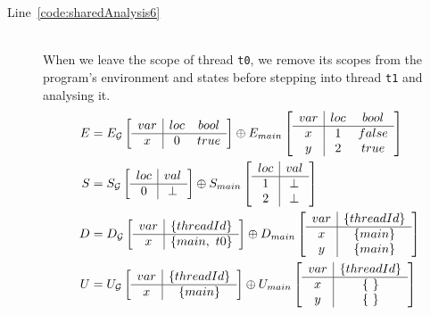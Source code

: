 \begin{description}
	\item[Line~\ref{code:sharedAnalysis6}] \hfill \\
		When we leave the scope of thread \verb$t0$, we remove its scopes from the
		program's environment and states before stepping into thread \verb$t1$ and 
		analysing it.
		\begin{align*}
			E &= E_{\mathcal{G}} \left[
				\begin{array}{c | c c}
					var	& loc	& bool	\\ \hline
					x	& 0		& true
				\end{array}
			\right]
			\oplus
			E_{main} \left[
				\begin{array}{c | c c}
					var	& loc	& bool	\\ \hline
					x	& 1		& false	\\
					y	& 2		& true
				\end{array}
			\right] \\		
			S &= S_{\mathcal{G}} \left[
				\begin{array}{c | c c}
					loc	& val	\\ \hline
					0	& \bot
				\end{array}
			\right]
			\oplus
			S_{main} \left[
				\begin{array}{c | c c}
					loc	& val	\\ \hline
					1	& \bot	\\
					2	& \bot
				\end{array}
			\right] \\
			D &= D_{\mathcal{G}} \left[
				\begin{array}{c | c}
					var	& \lbrace threadId \rbrace	\\ \hline
					x	& \lbrace main,~t0 \rbrace
				\end{array}
			\right]
			\oplus
			D_{main} \left[
				\begin{array}{c | c c}
					var	& \lbrace threadId \rbrace	\\ \hline
					x	& \lbrace main \rbrace		\\
					y	& \lbrace main \rbrace
				\end{array}
			\right] \\
			U &= U_{\mathcal{G}} \left[
				\begin{array}{c | c}
					var	& \lbrace threadId \rbrace	\\ \hline
					x	& \lbrace main \rbrace
				\end{array}
			\right]	
			\oplus
			U_{main} \left[
				\begin{array}{c | c c}
					var	& \lbrace threadId \rbrace	\\ \hline
					x	& \lbrace ~ \rbrace			\\
					y	& \lbrace ~ \rbrace
				\end{array}
			\right]
		\end{align*}


\end{description}
